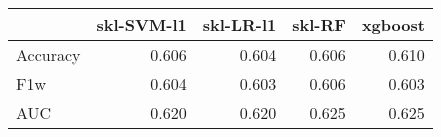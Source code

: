 \begin{tabular}{lrrrr}
\toprule
{} &  skl-SVM-l1 &  skl-LR-l1 &  skl-RF &  xgboost \\
\midrule
Accuracy &       0.606 &      0.604 &   0.606 &    0.610 \\
F1w      &       0.604 &      0.603 &   0.606 &    0.603 \\
AUC      &       0.620 &      0.620 &   0.625 &    0.625 \\
\bottomrule
\end{tabular}
